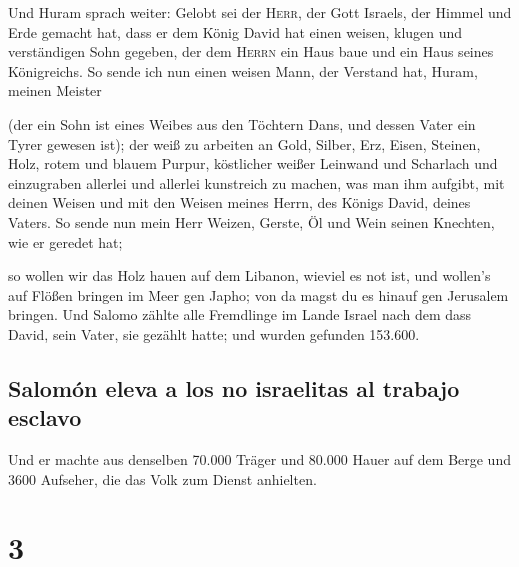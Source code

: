  Und Huram sprach weiter: Gelobt sei der \textsc{Herr},
der Gott Israels, der Himmel und Erde gemacht hat, dass er dem König
David hat einen weisen, klugen und verständigen Sohn gegeben, der dem
\textsc{Herrn} ein Haus baue und ein Haus seines Königreichs.
 So sende ich nun einen weisen Mann, der Verstand hat,
Huram, meinen Meister

 (der ein Sohn ist eines Weibes aus den Töchtern Dans,
und dessen Vater ein Tyrer gewesen ist); der weiß zu arbeiten an Gold,
Silber, Erz, Eisen, Steinen, Holz, rotem und blauem Purpur, köstlicher
weißer Leinwand und Scharlach und einzugraben allerlei und allerlei
kunstreich zu machen, was man ihm aufgibt, mit deinen Weisen und mit den
Weisen meines Herrn, des Königs David, deines Vaters.  So
sende nun mein Herr Weizen, Gerste, Öl und Wein seinen Knechten, wie er
geredet hat;

 so wollen wir das Holz hauen auf dem Libanon, wieviel es
not ist, und wollen's auf Flößen bringen im Meer gen Japho; von da magst
du es hinauf gen Jerusalem bringen.  Und Salomo zählte
alle Fremdlinge im Lande Israel nach dem dass David, sein Vater, sie
gezählt hatte; und wurden gefunden 153.600.

\hypertarget{salomuxf3n-eleva-a-los-no-israelitas-al-trabajo-esclavo}{%
\subsection{Salomón eleva a los no israelitas al trabajo
esclavo}\label{salomuxf3n-eleva-a-los-no-israelitas-al-trabajo-esclavo}}

 Und er machte aus denselben 70.000 Träger und 80.000
Hauer auf dem Berge und 3600 Aufseher, die das Volk zum Dienst
anhielten.

\hypertarget{section-2}{%
\section{3}\label{section-2}}

